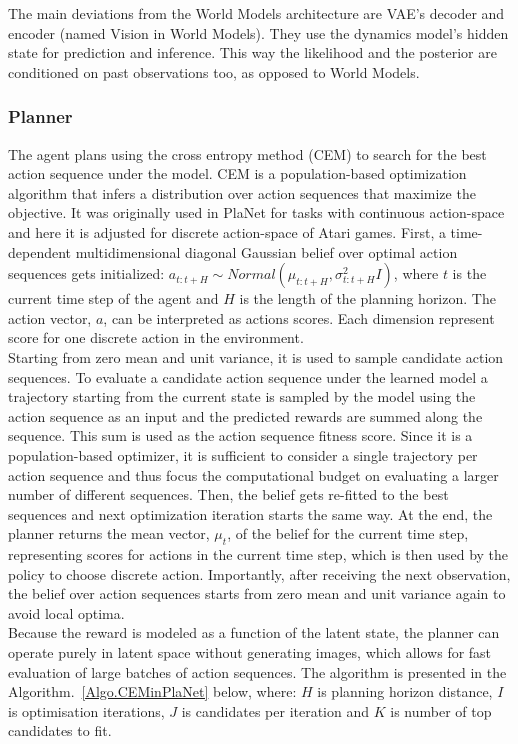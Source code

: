 The main deviations from the World Models architecture are VAE's decoder and encoder (named Vision in World Models). They use the dynamics model's hidden state for prediction and inference. This way the likelihood and the posterior are conditioned on past observations too, as opposed to World Models.

\subsubsection{Planner}

The agent plans using the cross entropy method (CEM) \cite{Algo.CEM} to search for the best action sequence under the model. CEM is a population-based optimization algorithm that infers a distribution over action sequences that maximize the objective. It was originally used in PlaNet for tasks with continuous action-space and here it is adjusted for discrete action-space of Atari games. First, a time-dependent multidimensional diagonal Gaussian belief over optimal action sequences gets initialized: $a_{t:t+H} \sim Normal(\mu_{t:t+H}, \sigma^2_{t:t+H}I)$, where $t$ is the current time step of the agent and $H$ is the length of the planning horizon. The action vector, $a$, can be interpreted as actions scores. Each dimension represent score for one discrete action in the environment. \\
Starting from zero mean and unit variance, it is used to sample candidate action sequences. To evaluate a candidate action sequence under the learned model a trajectory starting from the current state is sampled by the model using the action sequence as an input and the predicted rewards are summed along the sequence. This sum is used as the action sequence fitness score. Since it is a population-based optimizer, it is sufficient to consider a single trajectory per action sequence and thus focus the computational budget on evaluating a larger number of different sequences. Then, the belief gets re-fitted to the best sequences and next optimization iteration starts the same way. At the end, the planner returns the mean vector, $\mu_t$, of the belief for the current time step, representing scores for actions in the current time step, which is then used by the policy to choose discrete action. Importantly, after receiving the next observation, the belief over action sequences starts from zero mean and unit variance again to avoid local optima. \\
Because the reward is modeled as a function of the latent state, the planner can operate purely in latent space without generating images, which allows for fast evaluation of large batches of action sequences. The algorithm is presented in the Algorithm.~\ref{Algo.CEMinPlaNet} below, where: $H$ is planning horizon distance, $I$ is optimisation iterations, $J$ is candidates per iteration and $K$ is number of top candidates to fit.

